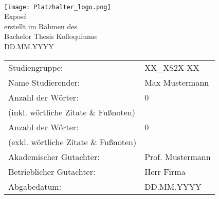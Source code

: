 \begin{center}
     \\ [3ex]
    \texttt{[image: Platzhalter\_logo.png]} \\ [3ex]
    \large{Exposé} \\ [-9pt]
    \large{erstellt im Rahmen des} \\ [-9pt]
    \large{Bachelor Thesis Kolloquiums:} \\ [-9pt]
    \large{DD.MM.YYYY}
\end{center}

\begin{table}[h]
    \renewcommand{\arraystretch}{2.5}%
    \setlength{\tabcolsep}{32pt}
    \begin{tabularx}{\textwidth}{l l}
        Studiengruppe:                       & XX\_XS2X-XX      \\
        Name Studierender:                   & Max Mustermann   \\
        Anzahl der Wörter:                   & 0                \\ [-15pt]
        (inkl. wörtliche Zitate \& Fußnoten) & ~                \\
        Anzahl der Wörter:                   & 0                \\ [-15pt]
        (exkl. wörtliche Zitate \& Fußnoten) & ~                \\
        Akademischer Gutachter:              & Prof. Mustermann \\ [-15pt]
        Betrieblicher Gutachter:             & Herr Firma       \\
        Abgabedatum:                         & DD.MM.YYYY       \\
    \end{tabularx}
\end{table}

\newpage